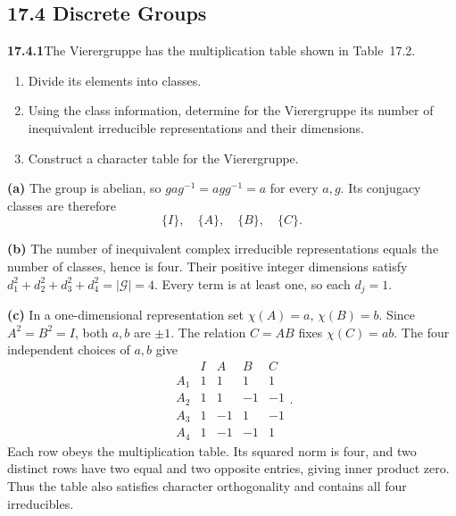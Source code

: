 \subsection*{17.4 Discrete Groups}

\par\bigskip
\noindent\textbf{17.4.1}\quad The Vierergruppe has the multiplication
table shown in Table~17.2.
\begin{enumerate}
\item[(a)] Divide its elements into classes.
\item[(b)] Using the class information, determine for the
Vierergruppe its number of inequivalent irreducible representations
and their dimensions.
\item[(c)] Construct a character table for the Vierergruppe.
\end{enumerate}
\solution
\textbf{(a)} The group is abelian, so
$gag^{-1}=agg^{-1}=a$ for every $a,g$.
Its conjugacy classes are therefore
\[
\boxed{\{I\},\quad\{A\},\quad\{B\},\quad\{C\}}.
\]

\textbf{(b)} The number of inequivalent complex irreducible
representations equals the number of classes, hence is four.
Their positive integer dimensions satisfy
$d_1^2+d_2^2+d_3^2+d_4^2=|\mathcal G|=4$.
Every term is at least one, so each $d_j=1$.

\textbf{(c)} In a one-dimensional representation set
$\chi(A)=a$, $\chi(B)=b$.
Since $A^2=B^2=I$, both $a,b$ are $\pm1$.
The relation $C=AB$ fixes $\chi(C)=ab$.
The four independent choices of $a,b$ give
\[
\boxed{\begin{array}{c|rrrr}
&I&A&B&C\\\hline
A_1&1&1&1&1\\
A_2&1&1&-1&-1\\
A_3&1&-1&1&-1\\
A_4&1&-1&-1&1
\end{array}}.
\]
Each row obeys the multiplication table. Its squared norm
is four, and two distinct rows have two equal and two opposite
entries, giving inner product zero. Thus the table also satisfies
character orthogonality and contains all four irreducibles.

